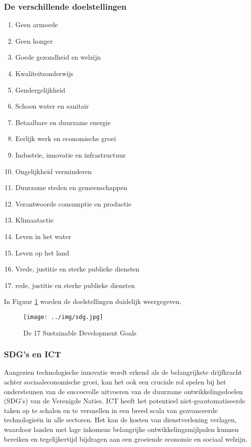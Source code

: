  \subsubsection{De verschillende doelstellingen}
 \begin{enumerate}
 	\item Geen armoede
 		\item Geen honger
 		\item Goede gezondheid en welzijn
 		\item Kwaliteitsonderwijs
 		\item Gendergelijkheid
 		\item Schoon water en sanitair
 		\item Betaalbare en duurzame energie
 		\item Eerlijk werk en economische groei
 		\item Industrie, innovatie en infrastructuur
 		\item Ongelijkheid verminderen
 		\item Duurzame steden en gemeenschappen
 		\item Verantwoorde consumptie en productie
 		\item Klimaatactie
 		\item Leven in het water
 		\item Leven op het land
 		\item Vrede, justitie en sterke publieke diensten
 		\item rede, justitie en sterke publieke diensten 
 \end{enumerate}
\autocite{VerenigdeNaties2004}

In Figuur \ref{sdgs} worden de doelstellingen duidelijk weergegeven.
 
 \begin{figure}[h!]
 	\texttt{[image: ../img/sdg.jpg]}
 	\caption{De 17 Sustainable Development Goals  \autocite{VerenigdeNaties2004}}
 	\label{sdgs}
 \end{figure}

\subsubsection{SDG's en ICT}
Aangezien technologische innovatie wordt erkend als de belangrijkste drijfkracht achter sociaaleconomische groei, kan het ook een cruciale rol spelen bij het ondersteunen van de succesvolle uitvoeren van de duurzame ontwikkelingsdoelen (SDG's) van de Verenigde Naties. ICT heeft het potentieel niet-geautomatiseerde taken op te schalen en te versnellen in een breed scala van geavanceerde technologieën in alle sectoren. Het kan de kosten van dienstverlening verlagen, waardoor landen met lage inkomens belangrijke ontwikkelingsmijlpalen kunnen bereiken en tegelijkertijd bijdragen aan een groeiende economie en sociaal welzijn. \autocite{Ameyed2018}

